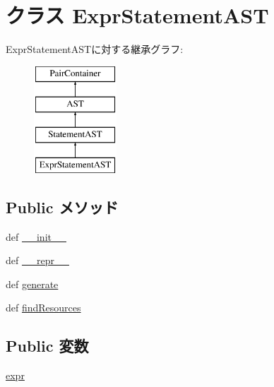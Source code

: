 \hypertarget{classslicc_1_1ast_1_1ExprStatementAST_1_1ExprStatementAST}{
\section{クラス ExprStatementAST}
\label{classslicc_1_1ast_1_1ExprStatementAST_1_1ExprStatementAST}
}
ExprStatementASTに対する継承グラフ:\begin{figure}[H]
\begin{center}
\leavevmode
\includegraphics[height=4cm]{classslicc_1_1ast_1_1ExprStatementAST_1_1ExprStatementAST}
\end{center}
\end{figure}
\subsection*{Public メソッド}
\begin{DoxyCompactItemize}
\item 
def \hyperlink{classslicc_1_1ast_1_1ExprStatementAST_1_1ExprStatementAST_ac775ee34451fdfa742b318538164070e}{\_\-\_\-init\_\-\_\-}
\item 
def \hyperlink{classslicc_1_1ast_1_1ExprStatementAST_1_1ExprStatementAST_ad8b9328939df072e4740cd9a63189744}{\_\-\_\-repr\_\-\_\-}
\item 
def \hyperlink{classslicc_1_1ast_1_1ExprStatementAST_1_1ExprStatementAST_a4555d1cee0dccf3942ea35fe86de2e8e}{generate}
\item 
def \hyperlink{classslicc_1_1ast_1_1ExprStatementAST_1_1ExprStatementAST_abd195c795639b490ba2de4c1246105f1}{findResources}
\end{DoxyCompactItemize}
\subsection*{Public 変数}
\begin{DoxyCompactItemize}
\item 
\hyperlink{classslicc_1_1ast_1_1ExprStatementAST_1_1ExprStatementAST_a0358810928b8858d2b7cbfc344ba792a}{expr}
\end{DoxyCompactItemize}


